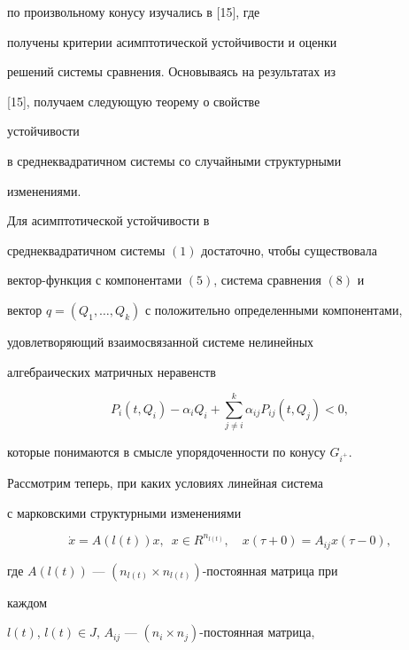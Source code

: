 по произвольному конусу изучались в [15], где  


получены критерии асимптотической устойчивости и оценки  


решений системы сравнения. Основываясь на результатах из  


[15], получаем следующую теорему о свойстве 


устойчивости  


в среднеквадратичном системы со случайными структурными  


изменениями.  


 


\begin{thm} 


Для асимптотической устойчивости в 


среднеквадратичном системы $(1)$ достаточно, чтобы существовала 


вектор-функция с компонентами $(5)$, система сравнения $(8)$ и 


вектор $q=(Q_1,\dotsc,Q_k)$ с положительно определенными компонентами, 


удовлетворяющий взаимосвязанной системе нелинейных  


алгебраических матричных неравенств 


$$ 


P_i(t,Q_i)-\alpha_i Q_i+\sum^k_{j\ne i}\alpha_{ij} 


P_{ij}(t,Q_j)<0, 


$$ 


которые понимаются в смысле упорядоченности по конусу $G_{i^+}$. 


\end{thm} 


 


Рассмотрим теперь, при каких условиях линейная система  


с марковскими структурными изменениями 


\begin{equation} 


\Dot x=A(l(t))x,\ \; x\in R^{n_{l(t)}},\quad 


x(\tau+0)=A_{ij}x(\tau-0), 


\end{equation} 


где $A(l(t))$ --- $(n_{l(t)}\times n_{l(t)})$-постоянная матрица при 


каждом  


$l(t)$, $l(t)\in J$, $A_{ij}$ --- $(n_i\times n_j)$-постоянная матрица, 



